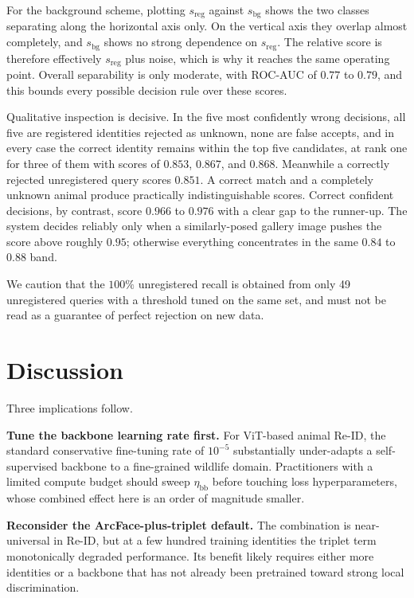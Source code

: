 \documentclass[conference]{IEEEtran}
\begin{document}
For the background scheme, plotting $s_{\text{reg}}$ against $s_{\text{bg}}$ shows the
two classes separating along the horizontal axis only. On the vertical axis they overlap
almost completely, and $s_{\text{bg}}$ shows no strong dependence on $s_{\text{reg}}$.
The relative score is therefore effectively $s_{\text{reg}}$ plus noise, which is why it
reaches the same operating point. Overall separability is only moderate, with ROC-AUC of
$0.77$ to $0.79$, and this bounds every possible decision rule over these scores.

Qualitative inspection is decisive. In the five most confidently wrong decisions, all
five are registered identities rejected as unknown, none are false accepts, and in every
case the correct identity remains within the top five candidates, at rank one for three
of them with scores of $0.853$, $0.867$, and $0.868$. Meanwhile a correctly rejected
unregistered query scores $0.851$. A correct match and a completely unknown animal
produce practically indistinguishable scores. Correct confident decisions, by contrast,
score $0.966$ to $0.976$ with a clear gap to the runner-up. The system decides reliably
only when a similarly-posed gallery image pushes the score above roughly $0.95$;
otherwise everything concentrates in the same $0.84$ to $0.88$ band.

We caution that the $100\%$ unregistered recall is obtained from only 49 unregistered
queries with a threshold tuned on the same set, and must not be read as a guarantee of
perfect rejection on new data.

\section{Discussion}
\label{sec:disc}

Three implications follow.

\textbf{Tune the backbone learning rate first.} For ViT-based animal Re-ID, the standard
conservative fine-tuning rate of $10^{-5}$ substantially under-adapts a self-supervised
backbone to a fine-grained wildlife domain. Practitioners with a limited compute budget
should sweep $\eta_{\text{bb}}$ before touching loss hyperparameters, whose combined
effect here is an order of magnitude smaller.

\textbf{Reconsider the ArcFace-plus-triplet default.} The combination is near-universal
in Re-ID, but at a few hundred training identities the triplet term monotonically
degraded performance. Its benefit likely requires either more identities or a backbone
that has not already been pretrained toward strong local discrimination.
\end{document}
